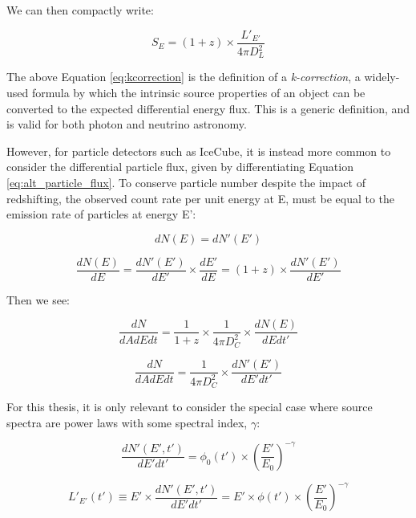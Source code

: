 We can then compactly write:

\begin{equation}
S_{E} = (1+z) \times \frac{L'_{E'}}{4 \pi D_{L}^{2}}
\label{eq:kcorrection}
\end{equation}

The above Equation \ref{eq:kcorrection} is the definition of a \emph{k-correction}, a widely-used formula by which the intrinsic source properties of an object can be converted to the expected differential energy flux. This is a generic definition, and is valid for both photon and neutrino astronomy. 

However, for particle detectors such as IceCube, it is instead more common to consider the differential particle flux, given by differentiating Equation \ref{eq:alt_particle_flux}. To conserve particle number despite the impact of redshifting, the observed count rate per unit energy at E, must be equal to the emission rate of particles at energy E':

\begin{equation}
dN(E) = dN'(E')
\end{equation}

\begin{equation}
\frac{dN(E)}{dE} = \frac{dN'(E')}{dE'} \times \frac{dE'}{dE} = (1+z) \times \frac{dN'(E')}{dE'}
\end{equation}

Then we see:

\begin{equation}
\frac{dN}{dAdE dt} = \frac{1}{1+z} \times \frac{1}{4 \pi D_{C}^{2}} \times \frac{dN(E)}{dEdt'}
\end{equation}

\begin{equation}
\frac{dN}{dAdEdt}= \frac{1}{4 \pi D_{C}^{2}} \times \frac{dN'(E')}{dE'dt'}
\end{equation}

For this thesis, it is only relevant to consider the special case where source spectra are power laws with some spectral index, $\gamma$:

\begin{equation}
\frac{dN'(E', t')}{dE'dt'} = \phi_{0}(t') \times \left( \frac{E'}{E_{0}}\right) ^{-\gamma}
\label{eq:def_pl}
\end{equation}

\begin{equation}
L'_{E'}(t') \equiv E' \times \frac{dN'(E', t')}{dE'dt'} = E' \times \phi(t') \times \left( \frac{E'}{E_{0}}\right) ^{-\gamma}
\label{eq:def_le}
\end{equation}

